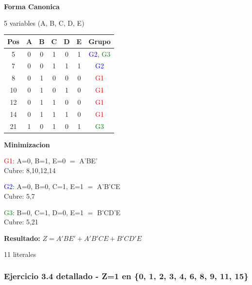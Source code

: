 \documentclass[12pt,a4paper]{article}
\begin{document}
\vspace{0.3cm}

\begin{minipage}[t]{0.58\textwidth}
\textbf{Forma Canonica}

5 variables (A, B, C, D, E)

{\small
\begin{tabular}{|c|c|c|c|c|c|c|}
\hline
Pos & A & B & C & D & E & Grupo \\
\hline
5  & 0 & 0 & 1 & 0 & 1 & \textcolor{blue}{G2}, \textcolor{green}{G3} \\
7  & 0 & 0 & 1 & 1 & 1 & \textcolor{blue}{G2} \\
8  & 0 & 1 & 0 & 0 & 0 & \textcolor{red}{G1} \\
10 & 0 & 1 & 0 & 1 & 0 & \textcolor{red}{G1} \\
12 & 0 & 1 & 1 & 0 & 0 & \textcolor{red}{G1} \\
14 & 0 & 1 & 1 & 1 & 0 & \textcolor{red}{G1} \\
21 & 1 & 0 & 1 & 0 & 1 & \textcolor{green}{G3} \\
\hline
\end{tabular}
}
\end{minipage}
\hspace{0.3cm}
\begin{minipage}[t]{0.38\textwidth}
\textbf{Minimizacion}

\vspace{0.2cm}
\textcolor{red}{G1}: A=0, B=1, E=0 $=$ A'BE' \\ Cubre: 8,10,12,14

\vspace{0.2cm}
\textcolor{blue}{G2}: A=0, B=0, C=1, E=1 $=$ A'B'CE \\ Cubre: 5,7

\vspace{0.2cm}
\textcolor{green}{G3}: B=0, C=1, D=0, E=1 $=$ B'CD'E \\ Cubre: 5,21

\vspace{0.3cm}
\textbf{Resultado:} $Z = A'BE' + A'B'CE + B'CD'E$

11 literales
\end{minipage}

\vspace{0.5cm}

\subsubsection{Ejercicio 3.4 detallado - Z=1 en \{0, 1, 2, 3, 4, 6, 8, 9, 11, 15\}}
\end{document}
